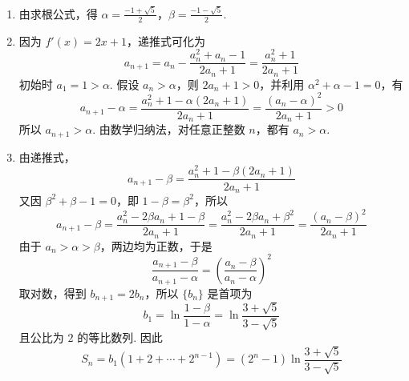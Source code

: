 \begin{solution}
\begin{enumerate}
\item 由求根公式，得
\(\alpha=\frac{-1+\sqrt5}{2}\)，\(\beta=\frac{-1-\sqrt5}{2}\).

\item 因为 \(f'(x)=2x+1\)，递推式可化为
\[
a_{n+1}=a_n-\frac{a_n^2+a_n-1}{2a_n+1}=\frac{a_n^2+1}{2a_n+1}
\]
初始时 \(a_1=1>\alpha\). 假设 \(a_n>\alpha\)，则 \(2a_n+1>0\)，并利用 \(\alpha^2+\alpha-1=0\)，有
\[
a_{n+1}-\alpha=\frac{a_n^2+1-\alpha(2a_n+1)}{2a_n+1}=\frac{(a_n-\alpha)^2}{2a_n+1}>0
\]
所以 \(a_{n+1}>\alpha\). 由数学归纳法，对任意正整数 \(n\)，都有 \(a_n>\alpha\).

\item 由递推式，
\[
a_{n+1}-\beta
=\frac{a_n^2+1-\beta(2a_n+1)}{2a_n+1}
\]
又因 \(\beta^2+\beta-1=0\)，即 \(1-\beta=\beta^2\)，所以
\[
a_{n+1}-\beta
=\frac{a_n^2-2\beta a_n+1-\beta}{2a_n+1}
=\frac{a_n^2-2\beta a_n+\beta^2}{2a_n+1}
=\frac{(a_n-\beta)^2}{2a_n+1}
\]
由于 \(a_n>\alpha>\beta\)，两边均为正数，于是
\[
\frac{a_{n+1}-\beta}{a_{n+1}-\alpha}=\left(\frac{a_n-\beta}{a_n-\alpha}\right)^2
\]
取对数，得到 \(b_{n+1}=2b_n\)，所以 \(\{b_n\}\) 是首项为
\[
b_1=\ln\frac{1-\beta}{1-\alpha}=\ln\frac{3+\sqrt5}{3-\sqrt5}
\]
且公比为 \(2\) 的等比数列. 因此
\[
S_n=b_1\left(1+2+\cdots+2^{n-1}\right)=(2^n-1)\ln\frac{3+\sqrt5}{3-\sqrt5}
\]
\end{enumerate}
\end{solution}
